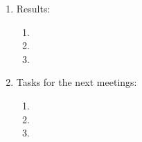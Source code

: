 \begin{enumerate}
\begin{enumerate}
	\end{enumerate}
	
	\item Results:
	\begin{enumerate}
		
		\item 
		
		\item 
		
        \item 
		
	\end{enumerate}
	
	\item Tasks for the next meetings:
	\begin{enumerate}
		
		\item 
		
		\item 
		
        \item 
			
	\end{enumerate}
\end{enumerate}
\fillpage
